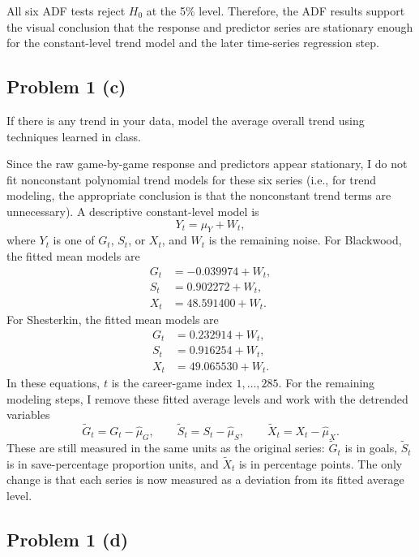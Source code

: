 \documentclass[
  10pt,
]{extarticle}
\begin{document}
All six ADF tests reject \(H_0\) at the 5\% level. Therefore, the ADF results support the visual conclusion that the response and predictor series are stationary enough for the constant-level trend model and the later time-series regression step.

\newpage

\subsection{Problem 1 (c)}\label{problem-1-c}

\begin{problem}[Problem 1 (c)]
If there is any trend in your data, model the average overall trend using techniques learned in class.
\end{problem}

Since the raw game-by-game response and predictors appear stationary, I do not fit nonconstant polynomial trend models for these six series (i.e., for trend modeling, the appropriate conclusion is that the nonconstant trend terms are unnecessary). A descriptive constant-level model is
\[
Y_t = \mu_Y + W_t,
\]
where \(Y_t\) is one of \(G_t\), \(S_t\), or \(X_t\), and \(W_t\) is the remaining noise. For Blackwood, the fitted mean models are
\[
\begin{aligned}
G_t &= -0.039974 + W_t,\\
S_t &= 0.902272 + W_t,\\
X_t &= 48.591400 + W_t.
\end{aligned}
\]
For Shesterkin, the fitted mean models are
\[
\begin{aligned}
G_t &= 0.232914 + W_t,\\
S_t &= 0.916254 + W_t,\\
X_t &= 49.065530 + W_t.
\end{aligned}
\]
In these equations, \(t\) is the career-game index \(1,\ldots,285\).
For the remaining modeling steps, I remove these fitted average levels and work with the detrended variables
\[
\tilde{G}_t = G_t - \hat{\mu}_G,\qquad
\tilde{S}_t = S_t - \hat{\mu}_S,\qquad
\tilde{X}_t = X_t - \hat{\mu}_X.
\]
These are still measured in the same units as the original series: \(\tilde{G}_t\) is in goals, \(\tilde{S}_t\) is in save-percentage proportion units, and \(\tilde{X}_t\) is in percentage points. The only change is that each series is now measured as a deviation from its fitted average level.

\newpage

\subsection{Problem 1 (d)}\label{problem-1-d}
\end{document}
